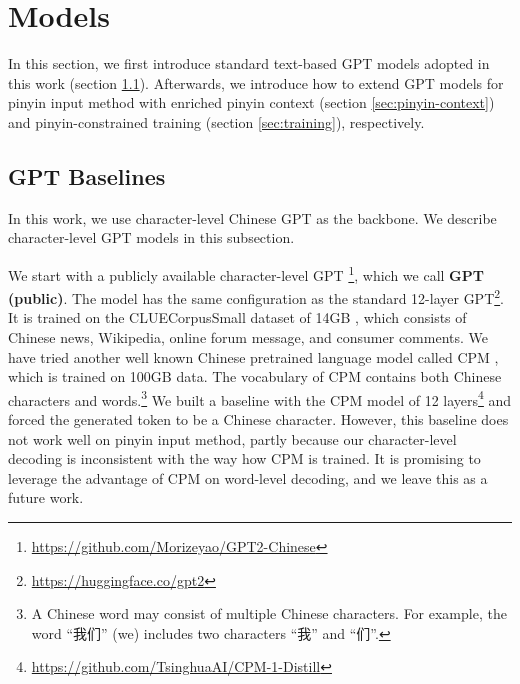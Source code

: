 \section{Models}
\label{sec:models}
In this section, we first introduce standard text-based GPT models adopted in this work (section \ref{sec:gpt}).
Afterwards, we introduce how to extend GPT models for pinyin input method with enriched pinyin context (section \ref{sec:pinyin-context}) and pinyin-constrained training (section \ref{sec:training}), respectively.


\subsection{GPT Baselines}
\label{sec:gpt}
In this work, we use character-level Chinese GPT as the backbone.
We describe character-level GPT models in this subsection.

We start with a publicly available character-level GPT  \cite{GPT2-Chinese}\footnote{\url{https://github.com/Morizeyao/GPT2-Chinese}}, which we call \textbf{GPT (public)}.
The model has the same configuration as the standard 12-layer GPT\footnote{\url{https://huggingface.co/gpt2}}. 
It is trained on the CLUECorpusSmall dataset of 14GB \cite{CLUECorpus2020}, which consists of Chinese news, Wikipedia, online forum message, and consumer comments.
We have tried another well known Chinese pretrained language model called CPM \citep{cpm-v1}, which is
trained on 100GB  data. The vocabulary of CPM contains both Chinese characters and words.\footnote{A Chinese word may consist of multiple Chinese characters. For example, the word ``我们'' (we) includes two characters ``我'' and ``们''. } 
We built a baseline with the CPM model of 12 layers\footnote{\url{https://github.com/TsinghuaAI/CPM-1-Distill}} and forced the generated token to be a Chinese character. 
However, this baseline does not work well on pinyin input method, partly because our character-level decoding is inconsistent with the way how CPM is trained.
It is promising to leverage the advantage of CPM on word-level decoding, and we leave this as a future work. 

